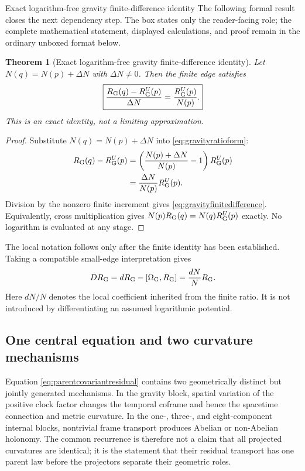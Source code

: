 \documentclass[11pt]{article}
\numberwithin{equation}{section}
\newtheorem{theorem}[definition]{Theorem}
\theoremstyle{remark}
\begin{document}
\begin{proofguide}{Exact logarithm-free gravity finite-difference identity}
The following formal result closes the next dependency step. The box states only the reader-facing role; the complete mathematical statement, displayed calculations, and proof remain in the ordinary unboxed format below.
\end{proofguide}
\begin{theorem}[Exact logarithm-free gravity finite-difference identity]
Let $N(q)=N(p)+\Delta N$ with $\Delta N\ne0$.  Then the finite edge satisfies
\begin{equation}
\boxed{\frac{R_{\rm G}(q)-R_{\rm G}^{U}(p)}{\Delta N}
=\frac{R_{\rm G}^{U}(p)}{N(p)}.}
\label{eq:gravityfinitedifference}
\end{equation}
This is an exact identity, not a limiting approximation.
\end{theorem}
\begin{proof}
Substitute $N(q)=N(p)+\Delta N$ into \eqref{eq:gravityratioform}:
\begin{align}
R_{\rm G}(q)-R_{\rm G}^{U}(p)
&=\left(\frac{N(p)+\Delta N}{N(p)}-1\right)R_{\rm G}^{U}(p)\\
&=\frac{\Delta N}{N(p)}R_{\rm G}^{U}(p).
\end{align}
Division by the nonzero finite increment gives \eqref{eq:gravityfinitedifference}.  Equivalently, cross multiplication gives $N(p)R_{\rm G}(q)=N(q)R_{\rm G}^{U}(p)$ exactly.  No logarithm is evaluated at any stage.
\end{proof}

The local notation follows only after the finite identity has been established.  Taking a compatible small-edge interpretation gives
\begin{equation}
D R_{\rm G}=dR_{\rm G}-[\Omega_{\rm G},R_{\rm G}]
=\frac{dN}{N}R_{\rm G}.
\label{eq:covariantresidualderivative}
\end{equation}
Here $dN/N$ denotes the local coefficient inherited from the finite ratio.  It is not introduced by differentiating an assumed logarithmic potential.

\subsection{One central equation and two curvature mechanisms}
Equation \eqref{eq:parentcovariantresidual} contains two geometrically distinct but jointly generated mechanisms.  In the gravity block, spatial variation of the positive clock factor changes the temporal coframe and hence the spacetime connection and metric curvature.  In the one-, three-, and eight-component internal blocks, nontrivial frame transport produces Abelian or non-Abelian holonomy.  The common recurrence is therefore not a claim that all projected curvatures are identical; it is the statement that their residual transport has one parent law before the projectors separate their geometric roles.
\end{document}
